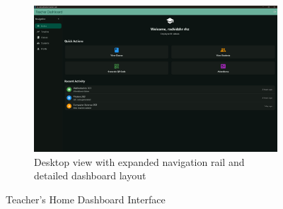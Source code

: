 \begin{figure}[H]
\begin{subfigure}[b]{0.48\textwidth}
    \end{subfigure}
    \hfill
    \begin{subfigure}[b]{0.48\textwidth}
        \includegraphics[width=\textwidth]{images/rachid/teacher-side-home-disktop.png}
        \caption{Desktop view with expanded navigation rail and detailed dashboard layout}
    \end{subfigure}
    \caption{Teacher's Home Dashboard Interface}
    \label{fig:home-interface}
\end{figure}

